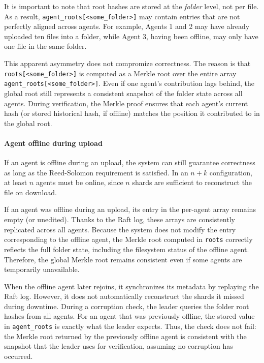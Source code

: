 It is important to note that root hashes are stored at the \emph{folder} level, not per file. As a result, \texttt{agent\_roots[<some\_folder>]} may contain entries that are not perfectly aligned across agents. For example, Agents 1 and 2 may have already uploaded ten files into a folder, while Agent 3, having been offline, may only have one file in the same folder.  

This apparent asymmetry does not compromize correctness. The reason is that \texttt{roots[<some\_folder>]} is computed as a Merkle root over the entire array \texttt{agent\_roots[<some\_folder>]}. Even if one agent's contribution lags behind, the global root still represents a consistent snapshot of the folder state across all agents. During verification, the Merkle proof ensures that each agent's current hash (or stored historical hash, if offline) matches the position it contributed to in the global root.  

\paragraph{Agent offline during upload}

If an agent is offline during an upload, the system can still guarantee correctness as long as the Reed-Solomon requirement is satisfied. In an $n+k$ configuration, at least $n$ agents must be online, since $n$ shards are sufficient to reconstruct the file on download.

If an agent was offline during an upload, its entry in the per-agent array remains empty (or unedited). Thanks to the Raft log, these arrays are consistently replicated across all agents. Because the system does not modify the entry corresponding to the offline agent, the Merkle root computed in \texttt{roots} correctly reflects the full folder state, including the filesystem status of the offline agent. Therefore, the global Merkle root remains consistent even if some agents are temporarily unavailable.

When the offline agent later rejoins, it synchronizes its metadata by replaying the Raft log. However, it does not automatically reconstruct the shards it missed during downtime. During a corruption check, the leader queries the folder root hashes from all agents. For an agent that was previously offline, the stored value in \texttt{agent\_roots} is exactly what the leader expects. Thus, the check does not fail: the Merkle root returned by the previously offline agent is consistent with the snapshot that the leader uses for verification, assuming no corruption has occurred.

